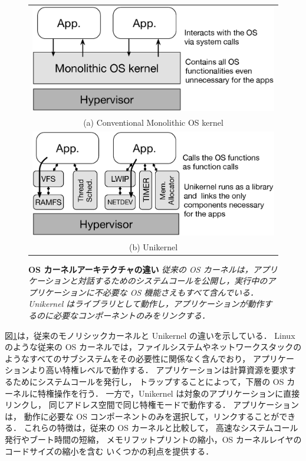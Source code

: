 \begin{figure}[t]
    \begin{center}
      \begin{tabular}{c}
        \includegraphics[scale=0.3]{./img/monolithic.eps} \\
        (a) Conventional Monolithic OS kernel       \vspace*{2mm} \\ 
        \includegraphics[scale=0.3]{./img/unikernel.eps} \\
        (b) Unikernel \\
      \end{tabular}
      \caption{\textbf{OS カーネルアーキテクチャの違い} \textit{従来の OS カーネルは，アプリケーションと対話するためのシステムコールを公開し，実行中のアプリケーションに不必要な OS 機能さえもすべて含んでいる．Unikernel はライブラリとして動作し，アプリケーションが動作するのに必要なコンポーネントのみをリンクする．}}
      \label{fig:kernels}
    \end{center}
  \end{figure}

図\ref{fig:kernels}は，従来のモノリシックカーネルと Unikernel の違いを示している．
Linux のような従来の OS カーネルでは，ファイルシステムやネットワークスタックのようなすべてのサブシステムをその必要性に関係なく含んでおり，
アプリケーションより高い特権レベルで動作する．
アプリケーションは計算資源を要求するためにシステムコールを発行し，
トラップすることによって，下層の OS カーネルに特権操作を行う．
一方で，Unikernel は対象のアプリケーションに直接リンクし，
同じアドレス空間で同じ特権モードで動作する．
アプリケーションは，
動作に必要な OS コンポーネントのみを選択して，リンクすることができる．
これらの特徴は，従来の OS カーネルと比較して，
高速なシステムコール発行やブート時間の短縮，
メモリフットプリントの縮小，OS カーネルレイヤのコードサイズの縮小を含む
いくつかの利点を提供する．

